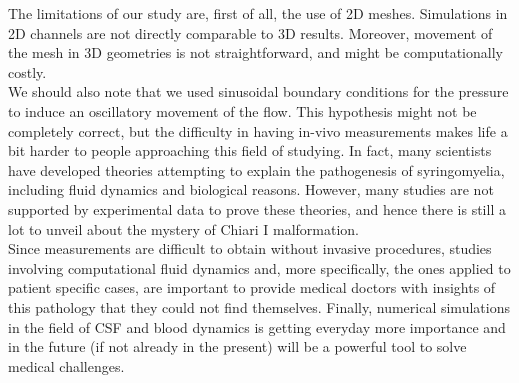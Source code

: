 \documentclass[a4paper,11pt,oneside]{book}
\begin{document}
The limitations of our study are, first of all, the use of 2D meshes. Simulations in 2D channels are not directly comparable to 3D results. Moreover, movement of the mesh in 3D geometries is not straightforward, and might be computationally costly. \\
We should also note that we used sinusoidal boundary conditions for the pressure to induce an oscillatory movement of the flow. This hypothesis might not be completely correct, but the difficulty in having in-vivo measurements makes life a bit harder to people approaching this field of studying. In fact, many scientists have developed theories attempting to explain the pathogenesis of syringomyelia, including fluid dynamics and biological reasons. However, many studies are not supported by experimental data to prove these theories, and hence there is still a lot to unveil about the mystery of Chiari I malformation. \\

Since measurements are difficult to obtain without invasive procedures, studies involving computational fluid dynamics and, more specifically, the ones applied to patient specific cases, are important to provide medical doctors with insights of this pathology that they could not find themselves. Finally, numerical simulations in the field of CSF and blood dynamics is getting everyday more importance and in the future (if not already in the present) will be a powerful tool to solve medical challenges.
\end{document}

